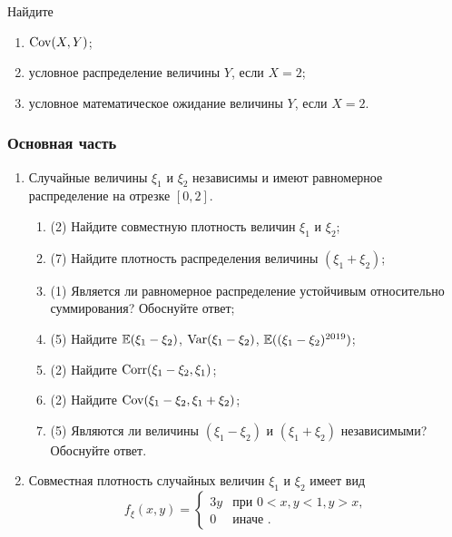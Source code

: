 \begin{enumerate}
  Найдите
  \begin{enumerate}
  \item $\operatorname{Cov}(X, Y)$;
  \item условное распределение величины $Y$, если $X=2$;
  \item условное математическое ожидание величины $Y$, если $X=2$.
  \end{enumerate}
  
  
  \end{enumerate}

  \subsubsection*{Основная часть}
  
  \begin{enumerate}
  
  \item Случайные величины $\xi_1$ и $\xi_2$ независимы и имеют равномерное распределение на отрезке $[0, 2]$.
  
  \begin{enumerate}
  \item (2) Найдите
   совместную плотность величин $\xi_1$ и $\xi_2$;
  \item (7) Найдите
   плотность распределения величины $(\xi_1+\xi_2)$;
  \item (1) Является ли равномерное распределение устойчивым относительно суммирования? Обоснуйте ответ;
  \item (5) Найдите $\operatorname{\mathbb{E}}(\xi_1-\xi_2)$, $\operatorname{Var}(\xi_1-\xi_2)$, $\operatorname{\mathbb{E}}((\xi_1-\xi_2)^{2019})$;
  \item (2) Найдите $\operatorname{Corr}(\xi_1-\xi_2,\xi_1)$;
  \item (2) Найдите $\operatorname{Cov}(\xi_1-\xi_2,\xi_1+\xi_2)$;
  \item (5) Являются ли величины $(\xi_1-\xi_2)$ и $(\xi_1+\xi_2)$ независимыми? Обоснуйте ответ.
  
  \end{enumerate}
  
  \item Совместная плотность случайных величин 
  $\xi_1$ и $\xi_2$ имеет вид
  \[
  f_{\xi}(x,y) =      \begin{cases}
                       3y           &   \text{при } 0<x,y <1, y>x, \\
                       0     &   \text{иначе } .
                    \end{cases}
  \]
  

\end{enumerate}
